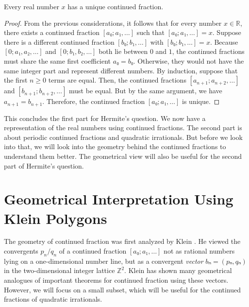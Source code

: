 \begin{theorem}
  \label{thm:irrat-cf}
  Every real number $x$ has a unique continued fraction.
\end{theorem}

\begin{proof}
  From the previous considerations, it follows that for every number $x ∈ ℝ$,
  there exists a continued fraction $[a₀; a₁, …]$ such that $[a₀; a₁, …] = x$.
  Suppose there is a different continued fraction $[b₀; b₁, …]$ with $[b₀; b₁, …] = x$.
  Because $[0; a₁, a₂, …]$ and $[0; b₁, b₂, …]$ both lie between $0$ and $1$,
  the continued fractions must share the same first coefficient $a₀ = b₀$.
  Otherwise, they would not have the same integer part and represent different numbers.
  By induction, suppose that the first $n ≥ 0$ terms are equal.
  Then, the continued fractions $[a_{n+1}; a_{n+2}, …]$ and $[b_{n+1}; b_{n+2}, …]$ must be equal.
  But by the same argument, we have $a_{n+1} = b_{n+1}$.
  Therefore, the continued fraction $[a₀; a₁, …]$ is unique.
\end{proof}

This concludes the first part for Hermite's question.
We now have a representation of the real numbers using continued fractions.
The second part is about periodic continued fractions and quadratic irrationals.
But before we look into that, we will look into the geometry behind the continued fractions
to understand them better.
The geometrical view will also be useful for the second part of Hermite's question.

\section{Geometrical Interpretation Using Klein Polygons}

The geometry of continued fraction was first analyzed by Klein \cite{Klein95}.
He viewed the convergents $p_n/q_n$ of a continued fraction $[a₀; a₁, …]$ not
as rational numbers lying on a one-dimensional number line,
but as a convergent \emph{vector} $bₙ = (pₙ, qₙ)$ in the two-dimensional integer lattice $ℤ^2$.
Klein has shown many geometrical analogues of important theorems for continued fraction
using these vectors.
However, we will focus on a small subset, which will be useful for the
continued fractions of quadratic irrationals.

